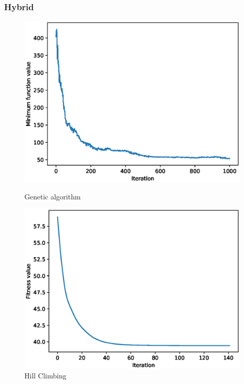\documentclass{article}
\begin{document}
\subsubsection{Hybrid}
\begin{figure}[!htbp]
	\centering
	\begin{minipage}{.48\textwidth}
		\centering
		\includegraphics[scale=.4]{experiment_3a_rastrigin/ga_min_eval_0.eps}
		\caption{Genetic algorithm}
	\end{minipage}\hfill
	\begin{minipage}{.48\textwidth}
		\centering
		\includegraphics[scale=.4]{experiment_3a_rastrigin/hc_max_fitness_0.eps}
		\caption{Hill Climbing}
	\end{minipage}\hfill
\end{figure}
\FloatBarrier
\end{document}

